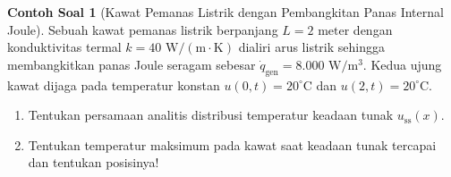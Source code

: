 \documentclass[11pt,a4paper]{article}
\theoremstyle{definition}
\newtheorem{example}{Contoh Soal}[section]
\begin{document}
\begin{example}[Kawat Pemanas Listrik dengan Pembangkitan Panas Internal Joule]
Sebuah kawat pemanas listrik berpanjang $L = 2\text{ meter}$ dengan konduktivitas termal $k = 40\text{ W}/(\text{m}\cdot\text{K})$ dialiri arus listrik sehingga membangkitkan panas Joule seragam sebesar $\dot{q}_{\text{gen}} = 8.000\text{ W}/\text{m}^3$. Kedua ujung kawat dijaga pada temperatur konstan $u(0, t) = 20^\circ\text{C}$ dan $u(2, t) = 20^\circ\text{C}$.
\begin{enumerate}[leftmargin=*]
    \item Tentukan persamaan analitis distribusi temperatur keadaan tunak $u_{\text{ss}}(x)$.
    \item Tentukan temperatur maksimum pada kawat saat keadaan tunak tercapai dan tentukan posisinya!
\end{enumerate}
\end{example}
\end{document}
